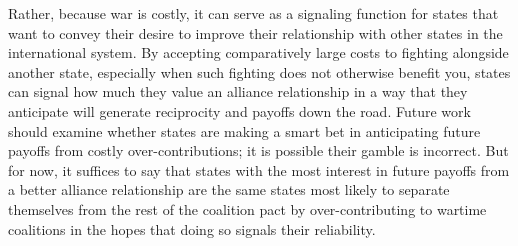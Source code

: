 \documentclass[12pt,letterpaper]{article}
\begin{document}
	Rather, because war is costly, it can serve as a signaling function for states that want to convey their desire to improve their relationship with other states in the international system. By accepting comparatively large costs to fighting alongside another state, especially when such fighting does not otherwise benefit you, states can signal how much they value an alliance relationship in a way that they anticipate will generate reciprocity and payoffs down the road. Future work should examine whether states are making a smart bet in anticipating future payoffs from costly over-contributions; it is possible their gamble is incorrect. But for now, it suffices to say that states with the most interest in future payoffs from a better alliance relationship are the same states most likely to separate themselves from the rest of the coalition pact by over-contributing to wartime coalitions in the hopes that doing so signals their reliability.

\newpage

\theendnotes

\newpage



\end{document}
